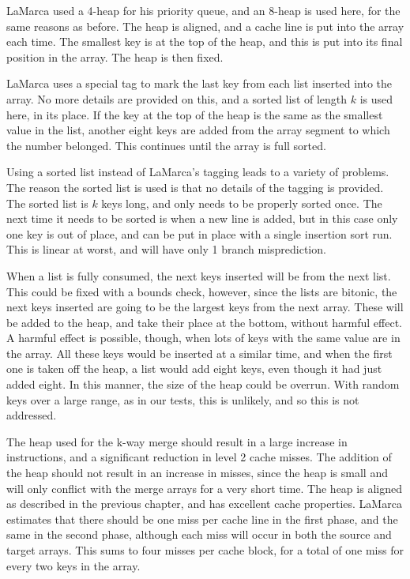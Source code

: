 LaMarca used a 4-heap for his priority queue, and an 8-heap is used here, for
the same reasons as before. The heap is aligned, and a cache line
is put into the array each time. The smallest key is at the top of the heap,
and this is put into its final position in the array. The heap is then fixed.

LaMarca uses a special tag to mark the last key from each list inserted into
the array. No more details are provided on this, and a sorted list of length $k$
is used here, in its place.  If the key at the top of the heap is the same as
the smallest value in the list, another eight keys are added from the array
segment to which the number belonged. This continues until the array is full
sorted.

Using a sorted list instead of LaMarca's tagging leads to a variety of problems.
The reason the sorted list is used is that no details of the tagging is
provided. The sorted list is $k$ keys long, and only needs to be properly sorted
once. The next time it needs to be sorted is when a new line is added, but in
this case only one key is out of place, and can be put in place with a single
insertion sort run. This is linear at worst, and will have only 1 branch
misprediction.

When a list is fully consumed, the next keys inserted will be from the next
list. This could be fixed with a bounds check, however, since the lists are
bitonic, the next keys inserted are going to be the largest keys from the next
array. These will be added to the heap, and take their place at the bottom,
without harmful effect. A harmful effect is possible, though, when lots of keys 
with the same value are in the array. All these keys would be inserted at a
similar time, and when the first one is taken off the heap, a list would add
eight keys, even though it had just added eight. In this manner, the size of the
heap could be overrun. With random keys over a large range, as in our tests,
this is unlikely, and so this is not addressed.

The heap used for the k-way merge should result in a large increase in
instructions, and a significant reduction in level 2 cache misses. The addition
of the heap should not result in an increase in misses, since the heap is small
and will only conflict with the merge arrays for a very short time. The heap is
aligned as described in the previous chapter, and has excellent cache
properties. LaMarca estimates that there should be one miss per cache line
in the first phase, and the same in the second phase, although each miss will
occur in both the source and target arrays. This sums to four misses per cache
block, for a total of one miss for every two keys in the array.

